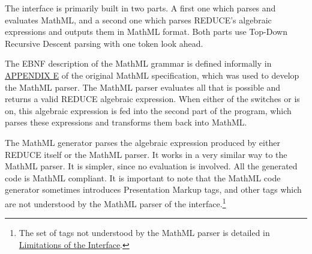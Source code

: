 The interface is primarily built in two parts.  A first one which
parses and evaluates MathML, and a second one which parses REDUCE's
algebraic expressions and outputs them in MathML format.  Both parts
use Top-Down Recursive Descent parsing with one token look ahead.

The EBNF description of the MathML grammar is defined informally in
\href{https://www.w3.org/TR/REC-MathML/appendixE.html}{APPENDIX E} of
the original MathML specification, which was used to develop the
MathML parser.  The MathML parser evaluates all that is possible and
returns a valid REDUCE algebraic expression.  When either of the
switches  or  is on, this algebraic expression is
fed into the second part of the program, which parses these expressions
and transforms them back into MathML.

The MathML generator parses the algebraic expression produced by
either REDUCE itself or the MathML parser.  It works in a very similar
way to the MathML parser.  It is simpler, since no evaluation is
involved.  All the generated code is MathML compliant.  It is
important to note that the MathML code generator sometimes introduces
Presentation Markup tags, and other tags which are not understood by
the MathML parser of the interface.\footnote{The set of tags not
understood by the MathML parser is detailed in
\hyperref[mathml:limitations]{Limitations of the Interface}.}
